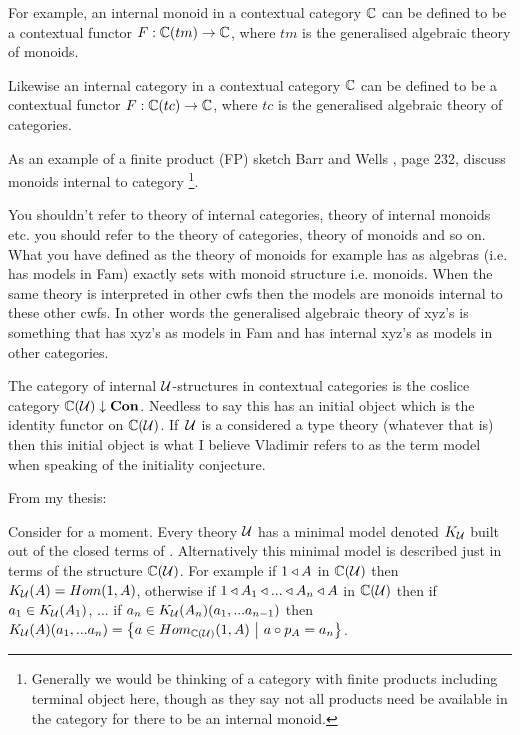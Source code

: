 \note
For example, an internal monoid in a contextual category $\ccat[C]$
can be defined to be a contextual functor $F: \ccat[C](tm) \morph  \ccat[C]$, where $tm$ is the generalised algebraic theory of monoids.


\note 
Likewise an internal category in a contextual category $\ccat[C]$
can be defined to be a contextual functor $F: \ccat[C](tc) \morph  \ccat[C]$, where $tc$ is the generalised algebraic theory of categories.



\note
As an example of a finite product (FP) sketch Barr and Wells \cite{BarrandWells}, page 232, discuss monoids internal to  category
\footnote{Generally we would be thinking of a category with finite products including terminal object here, though as they say not all products need be available in the category for there to be an internal monoid.}.

\begin{notebox}
You  shouldn't refer to theory of internal categories, theory of internal monoids etc. you should refer to the
theory of categories, theory of monoids and so on. What you have defined as the theory of monoids for example has
as algebras (i.e. has models in Fam) exactly sets with monoid structure i.e. monoids. When the same theory is interpreted in other cwfs then
the models are monoids internal to these other cwfs. In other words the generalised algebraic theory of xyz's is something that has xyz's as models in Fam and has internal xyz's as models in other categories. 
\end{notebox}

\note The category of internal $\gat[U]$-structures in contextual categories is the coslice category
$\CofU \downarrow \catCon$. Needless to say this has an initial object which is the identity functor on  $\CofU$.
If\ $\gat[U]$ is a considered a type theory (whatever that is) then this initial object is what I believe Vladimir refers
to as the term model when speaking of the initiality conjecture.



\note From my thesis:
\begin{tightquote}
Consider for a moment. Every theory $\gat[U]$ has a minimal model denoted $\KU$ built out of the closed terms of \gat[U]. Alternatively this minimal model is described just in terms of the structure $\CofU$. For example
if $1 \base A$ in $\CofU$ then 
$\KU(A)=Hom(1,A)$, otherwise if $1 \base A_1 \base ... \base A_n \base A$ in $\CofU$
then if $a_1 \in \KU(A_1)$, ... if $a_n \in \KU(A_n)(a_1,...a_{n-1})$ then 
$\KU(A)(a_1,...a_n)=\setsuchthat{a\in Hom_{\CofU}(1,A)}{a \circ p_A = a_n}$. \\
\end{tightquote} 

